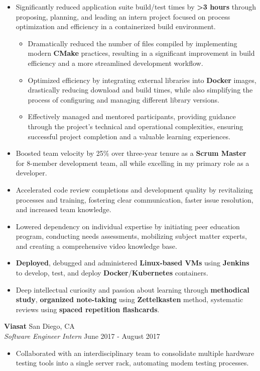 \documentclass[a4paper]{article}
\begin{document}
\begin{itemize}
\begin{itemize}
        \end{itemize}
	\item Significantly reduced application suite build/test times by \textbf{>3 hours} through proposing, planning, and leading an intern project focused on process optimization and efficiency in a containerized build environment.
    \begin{itemize}
	    \item Dramatically reduced the number of files compiled by implementing modern \textbf{CMake} practices, resulting in a significant improvement in build efficiency and a more streamlined development workflow.
	    \item Optimized efficiency by integrating external libraries into \textbf{Docker} images, drastically reducing download and build times, while also simplifying the process of configuring and managing different library versions.
	    \item Effectively managed and mentored participants, providing guidance through the project's technical and operational complexities, ensuring successful project completion and a valuable learning experiences.
    \end{itemize}
	\item Boosted team velocity by 25\% over three-year tenure as a \textbf{Scrum Master} for 8-member development team, all while excelling in my primary role as a developer.
	\item Accelerated code review completions and development quality by revitalizing processes and training, fostering clear communication, faster issue resolution, and increased team knowledge.
	\item Lowered dependency on individual expertise by initiating peer education program, conducting needs assessments, mobilizing subject matter experts, and creating a comprehensive video knowledge base.
	\item \textbf{Deployed}, debugged and administered \textbf{Linux-based VMs} using \textbf{Jenkins} to develop, test, and deploy \textbf{Docker}/\textbf{Kubernetes} containers.
	\item Deep intellectual curiosity and passion about learning through \textbf{methodical study}, \textbf{organized note-taking} using \textbf{Zettelkasten} method, systematic reviews using \textbf{spaced repetition flashcards}.
\end{itemize}

\vspace{-1mm}
\textbf{Viasat} \hfill San Diego, CA\\
\textit{Software Engineer Intern} \hfill June 2017 - August 2017\\
\vspace{-1mm}
\begin{itemize} \itemsep 1pt
    \item Collaborated with an interdisciplinary team to consolidate multiple hardware testing tools into a single server rack, automating modem testing processes.
\end{itemize}
\end{document}
